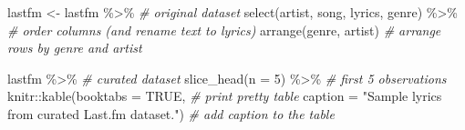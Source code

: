 \documentclass[
]{article}
\newenvironment{Shaded}{\begin{snugshade}}{\end{snugshade}}
\newcommand{\AttributeTok}[1]{\textcolor[rgb]{0.77,0.63,0.00}{#1}}
\newcommand{\CommentTok}[1]{\textcolor[rgb]{0.56,0.35,0.01}{\textit{#1}}}
\newcommand{\ConstantTok}[1]{\textcolor[rgb]{0.00,0.00,0.00}{#1}}
\newcommand{\DecValTok}[1]{\textcolor[rgb]{0.00,0.00,0.81}{#1}}
\newcommand{\FunctionTok}[1]{\textcolor[rgb]{0.00,0.00,0.00}{#1}}
\newcommand{\NormalTok}[1]{#1}
\newcommand{\OtherTok}[1]{\textcolor[rgb]{0.56,0.35,0.01}{#1}}
\newcommand{\SpecialCharTok}[1]{\textcolor[rgb]{0.00,0.00,0.00}{#1}}
\newcommand{\StringTok}[1]{\textcolor[rgb]{0.31,0.60,0.02}{#1}}
\begin{document}
\begin{Shaded}
\begin{Highlighting}[]
\NormalTok{lastfm }\OtherTok{\textless{}{-}} 
\NormalTok{  lastfm }\SpecialCharTok{\%\textgreater{}\%} \CommentTok{\# original dataset}
  \FunctionTok{select}\NormalTok{(artist, song, lyrics, genre) }\SpecialCharTok{\%\textgreater{}\%} \CommentTok{\# order columns (and rename \textasciigrave{}text\textasciigrave{} to \textasciigrave{}lyrics\textasciigrave{})}
  \FunctionTok{arrange}\NormalTok{(genre, artist) }\CommentTok{\# arrange rows by \textasciigrave{}genre\textasciigrave{} and \textasciigrave{}artist\textasciigrave{}}

\NormalTok{lastfm }\SpecialCharTok{\%\textgreater{}\%} \CommentTok{\# curated dataset}
  \FunctionTok{slice\_head}\NormalTok{(}\AttributeTok{n =} \DecValTok{5}\NormalTok{) }\SpecialCharTok{\%\textgreater{}\%} \CommentTok{\# first 5 observations}
\NormalTok{  knitr}\SpecialCharTok{::}\FunctionTok{kable}\NormalTok{(}\AttributeTok{booktabs =} \ConstantTok{TRUE}\NormalTok{, }\CommentTok{\# print pretty table}
               \AttributeTok{caption =} \StringTok{"Sample lyrics from curated Last.fm dataset."}\NormalTok{) }\CommentTok{\# add caption to the table}
\end{Highlighting}
\end{Shaded}
\end{document}
